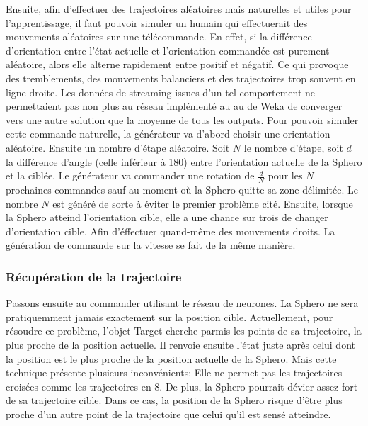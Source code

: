Ensuite, afin d'effectuer des trajectoires aléatoires mais naturelles et utiles pour l'apprentissage, il faut pouvoir simuler un humain qui effectuerait des mouvements aléatoires sur une télécommande.
En effet, si la différence d'orientation entre l'état actuelle et l'orientation commandée est purement aléatoire, alors elle alterne rapidement entre positif et négatif.
Ce qui provoque des tremblements, des mouvements balanciers et des trajectoires trop souvent en ligne droite.
Les données de streaming issues d'un tel comportement ne permettaient pas non plus au réseau implémenté au au \mlp de Weka de converger vers une autre solution que la moyenne de tous les outputs.
Pour pouvoir simuler cette commande naturelle, la générateur va d'abord choisir une orientation aléatoire.
Ensuite un nombre d'étape aléatoire.
Soit $N$ le nombre d'étape, soit $d$ la différence d'angle (celle inférieur à 180) entre l'orientation actuelle de la Sphero et la ciblée.
Le générateur va commander une rotation de $\frac{d}{N}$ pour les $N$ prochaines commandes sauf au moment où la Sphero quitte sa zone délimitée.
Le nombre $N$ est généré de sorte à éviter le premier problème cité.
Ensuite, lorsque la Sphero atteind l'orientation cible, elle a une chance sur trois de changer d'orientation cible.
Afin d'éffectuer quand-même des mouvements droits.
La génération de commande sur la vitesse se fait de la même manière.

\subsubsection{Récupération de la trajectoire}
Passons ensuite au commander utilisant le réseau de neurones.
La Sphero ne sera pratiquemment jamais exactement sur la position cible.
Actuellement, pour résoudre ce problème, l'objet Target cherche parmis les points de sa trajectoire, la plus proche de la position actuelle.
Il renvoie ensuite l'état juste après celui dont la position est le plus proche de la position actuelle de la Sphero.
Mais cette technique présente plusieurs inconvénients:
Elle ne permet pas les trajectoires croisées comme les trajectoires en 8.
De plus, la Sphero pourrait dévier assez fort de sa trajectoire cible.
Dans ce cas, la position de la Sphero risque d'être plus proche d'un autre point de la trajectoire que celui qu'il est sensé atteindre.
